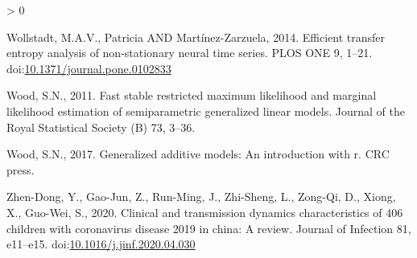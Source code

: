 \documentclass[]{elsarticle} %
\newlength{\cslhangindent}
\newenvironment{CSLReferences}[2] %
 {%
  \setlength{\parindent}{0pt}
  \ifodd #1 \everypar{\setlength{\hangindent}{\cslhangindent}}\ignorespaces\fi
  \ifnum #2 > 0
  \setlength{\parskip}{#2\baselineskip}
  \fi
 }%
 {}
\begin{document}
\begin{CSLReferences}{1}{0}
\leavevmode\hypertarget{ref-wollstadt2014efficient}{}%
Wollstadt, M.A.V., Patricia AND Martínez-Zarzuela, 2014. Efficient transfer entropy analysis of non-stationary neural time series. PLOS ONE 9, 1--21. doi:\href{https://doi.org/10.1371/journal.pone.0102833}{10.1371/journal.pone.0102833}

\leavevmode\hypertarget{ref-wood2011fast}{}%
Wood, S.N., 2011. Fast stable restricted maximum likelihood and marginal likelihood estimation of semiparametric generalized linear models. Journal of the Royal Statistical Society (B) 73, 3--36.

\leavevmode\hypertarget{ref-wood2017generalized}{}%
Wood, S.N., 2017. Generalized additive models: An introduction with r. CRC press.

\leavevmode\hypertarget{ref-zhendong2020clinical}{}%
Zhen-Dong, Y., Gao-Jun, Z., Run-Ming, J., Zhi-Sheng, L., Zong-Qi, D., Xiong, X., Guo-Wei, S., 2020. Clinical and transmission dynamics characteristics of 406 children with coronavirus disease 2019 in china: A review. Journal of Infection 81, e11--e15. doi:\href{https://doi.org/10.1016/j.jinf.2020.04.030}{10.1016/j.jinf.2020.04.030}

\end{CSLReferences}
\end{document}

